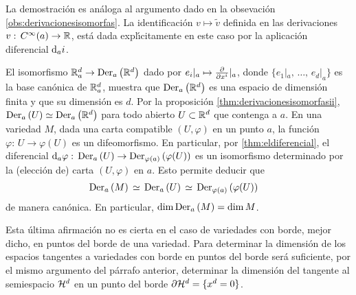 La demostraci\'{o}n es an\'{a}loga al argumento dado en la obsevaci\'{o}n
\ref{obs:derivacionesisomorfas}. La identificaci\'{o}n
$v\mapsto\tilde{v}$ definida en las derivaciones $v:\,C^{\infty}(a)%
\rightarrow\bb{R}$, est\'{a} dada expl\'{\i}citamente en este caso por la
aplicaci\'{o}n diferencial $\diferencial[a]{i}$.

El isomorfismo $\bb{R}^{d}_{a}\rightarrow\derivaciones[a]{\bb{R}^{d}}$
dado por $e_{i}|_{a}\mapsto\gancho{x^{i}}|_{a}$, donde
$\{e_{1}|_{a},\,\dots,\,e_{d}|_{a}\}$ es la base can\'{o}nica de
$\bb{R}^{d}_{a}$, muestra que $\derivaciones[a]{\bb{R}^{d}}$ es una espacio
de dimensi\'{o}n finita y que su dimensi\'{o}n es $d$. Por la
proposici\'{o}n \ref{thm:derivacionesisomorfasii},
$\derivaciones[a]{U}\simeq\derivaciones[a]{\bb{R}^{d}}$ para todo abierto
$U\subset\bb{R}^{d}$ que contenga a $a$. En una variedad $M$, dada una
carta compatible $(U,\varphi)$ en un punto $a$, la funci\'{o}n
$\varphi:\,U\rightarrow\varphi(U)$ es un difeomorfismo. En particular,
por \ref{thm:eldiferencial}, el diferencial $\diferencial[a]{\varphi}:\,%
\derivaciones[a]{U}\rightarrow\derivaciones[\varphi(a)]{\varphi(U)}$ es un
isomorfismo determinado por la (elecci\'{o}n de) carta $(U,\varphi)$ en $a$.
Esto permite deducir que
\begin{align*}
	\derivaciones[a]{M} & \,\simeq\,\derivaciones[a]{U}\,\simeq\,
		\derivaciones[\varphi(a)]{\varphi(U)}
\end{align*}
%
de manera can\'{o}nica. En particular, $\dim\,\derivaciones[a]{M}=\dim\,M$.

Esta \'{u}ltima afirmaci\'{o}n no es cierta en el caso de variedades con
borde, mejor dicho, en puntos del borde de una variedad. Para determinar la
dimensi\'{o}n de los espacios tangentes a variedades con borde en puntos
del borde ser\'{a} suficiente, por el mismo argumento del p\'{a}rrafo anterior,
determinar la dimensi\'{o}n del tangente al semiespacio $\hemi[d]$ en
un punto del borde $\borde{\hemi[d]}=\{x^{d}=0\}$.
